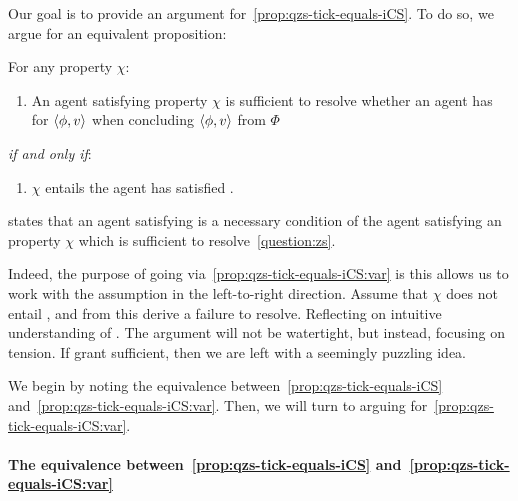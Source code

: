 \begin{note}
  Our goal is to provide an argument for~\autoref{prop:qzs-tick-equals-iCS}.
  To do so, we argue for an equivalent proposition:

  \begin{proposition}
    \label{prop:qzs-tick-equals-iCS:var}
    For any property \(\chi\):
    \begin{enumerate}[label=\Alph*.]
    \item
      \label{squish:A}
      An agent satisfying property \(\chi\) is sufficient to resolve whether an agent has \zs{} for \(\langle \phi, v \rangle\) when concluding \(\langle \phi, v \rangle\) from \(\Phi\)
    \end{enumerate}
    \emph{if and only if}:
    \begin{enumerate}[label=\Alph*.,resume]
    \item
      \label{squish:B}
      \(\chi\) entails the agent has satisfied \iCS{}.
    \end{enumerate}
  \end{proposition}

   states that an agent satisfying \iCS{} is a necessary condition of the agent satisfying an property \(\chi\) which is sufficient to resolve~\autoref{question:zs}.

    Indeed, the purpose of going via~\autoref{prop:qzs-tick-equals-iCS:var} is this allows us to work with the assumption in the left-to-right direction.
  Assume that \(\chi\) does not entail \iCS{}, and from this derive a failure to resolve.
  Reflecting on intuitive understanding of \qzs{}.
  The argument will not be watertight, but instead, focusing on tension.
  If grant sufficient, then we are left with a seemingly puzzling idea.
\end{note}

\begin{note}
  We begin by noting the equivalence between~\autoref{prop:qzs-tick-equals-iCS} and~\autoref{prop:qzs-tick-equals-iCS:var}.
  Then, we will turn to arguing for~\autoref{prop:qzs-tick-equals-iCS:var}.
\end{note}

\paragraph{The equivalence between~\autoref{prop:qzs-tick-equals-iCS} and~\autoref{prop:qzs-tick-equals-iCS:var}}

